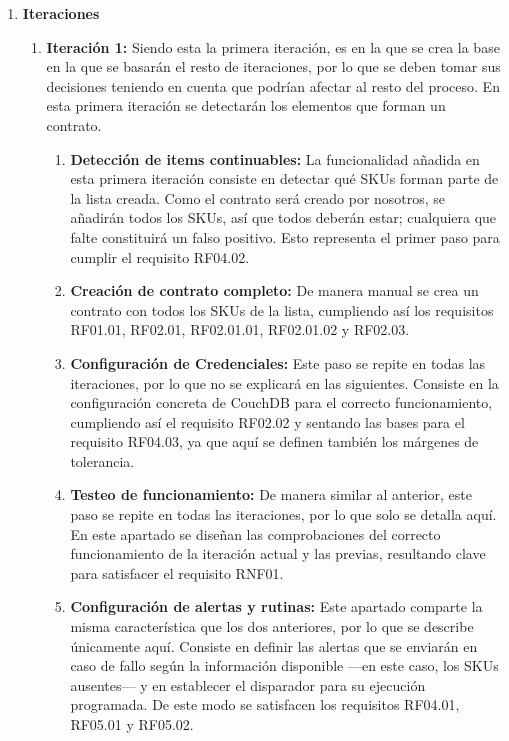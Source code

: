 \begin{enumerate}
    \item \textbf{Iteraciones}
          \setcounter{enumii}{0} %
          \begin{enumerate}
              \item \textbf{Iteración 1:} Siendo esta la primera iteración, es en la que se crea la base en la que se basarán el resto de iteraciones, por lo que se deben tomar sus decisiones teniendo en cuenta que podrían afectar al resto del proceso. En esta primera iteración se detectarán los elementos que forman un contrato.
                    \setcounter{enumiii}{0} %
                    \begin{enumerate}
                        \item \textbf{Detección de items continuables:} La funcionalidad añadida en esta primera iteración consiste en detectar qué SKUs forman parte de la lista creada. Como el contrato será creado por nosotros, se añadirán todos los SKUs, así que todos deberán estar; cualquiera que falte constituirá un falso positivo. Esto representa el primer paso para cumplir el requisito RF04.02.
                        \item \textbf{Creación de contrato completo:} De manera manual se crea un contrato con todos los SKUs de la lista, cumpliendo así los requisitos RF01.01, RF02.01, RF02.01.01, RF02.01.02 y RF02.03.
                        \item \textbf{Configuración de Credenciales:} Este paso se repite en todas las iteraciones, por lo que no se explicará en las siguientes. Consiste en la configuración concreta de CouchDB para el correcto funcionamiento, cumpliendo así el requisito RF02.02 y sentando las bases para el requisito RF04.03, ya que aquí se definen también los márgenes de tolerancia.
                        \item \textbf{Testeo de funcionamiento: } De manera similar al anterior, este paso se repite en todas las iteraciones, por lo que solo se detalla aquí. En este apartado se diseñan las comprobaciones del correcto funcionamiento de la iteración actual y las previas, resultando clave para satisfacer el requisito RNF01. 
                        \item \textbf{Configuración de alertas y rutinas: } Este apartado comparte la misma característica que los dos anteriores, por lo que se describe únicamente aquí. Consiste en definir las alertas que se enviarán en caso de fallo según la información disponible ---en este caso, los SKUs ausentes--- y en establecer el disparador para su ejecución programada. De este modo se satisfacen los requisitos RF04.01, RF05.01 y RF05.02.


\end{enumerate}
\end{enumerate}
\end{enumerate}
